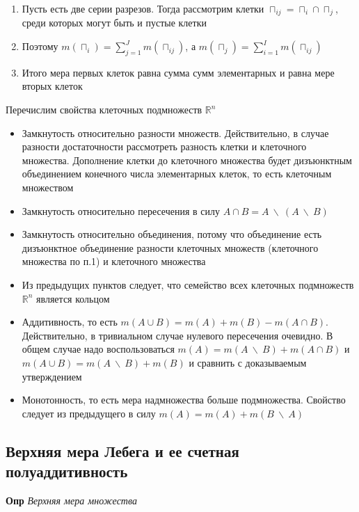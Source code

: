 \begin{enumerate}
    \item Пусть есть две серии разрезов.
    Тогда рассмотрим клетки $\sqcap_{ij} = \sqcap_{i} \cap \sqcap_{j}$, среди которых могут быть и пустые клетки
    \item Поэтому $m(\sqcap_{i}) = \sum_{j = 1}^{J} m(\sqcap_{ij})$, а $m(\sqcap_{j}) = \sum_{i = 1}^{I} m(\sqcap_{ij})$
    \item Итого мера первых клеток равна сумма сумм элементарных и равна мере вторых клеток
\end{enumerate}

Перечислим свойства клеточных подмножеств $\mathbb{R}^n$

\begin{itemize}
    \item Замкнутость относительно разности множеств.
    Действительно, в случае разности достаточности рассмотреть
    разность клетки и клеточного множества.
    Дополнение клетки до клеточного множества будет дизъюнктным
    объединением конечного числа элементарных клеток, то есть клеточным множеством
    \item Замкнутость относительно пересечения в силу $A \cap B = A~\backslash~(A~\backslash~B)$
    \item Замкнутость относительно объединения, потому что объединение есть дизъюнктное объединение разности клеточных множеств (клеточного
    множества по п.1) и клеточного множества
    \item Из предыдущих пунктов следует, что семейство всех клеточных подмножеств $\mathbb{R}^n$ является кольцом
    \item Аддитивность, то есть $m(A \cup B) = m(A) + m(B) - m(A \cap B)$.
    Действительно, в тривиальном случае нулевого пересечения очевидно.
    В общем случае надо воспользоваться $m(A) = m(A~\backslash~B) + m(A \cap B)$ и $m(A \cup B) = m(A~\backslash~B) + m(B)$ и
    сравнить с доказываемым утверждением
    \item Монотонность, то есть мера надмножества больше подмножества.
    Свойство следует из предыдущего в силу $m(A) = m(A) + m(B~\backslash~A)$
\end{itemize}

\subsection{Верхняя мера Лебега и ее счетная полуаддитивность}

\textbf{Опр} \textit{Верхняя мера множества}

